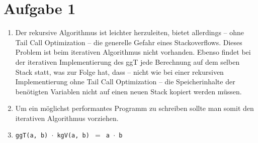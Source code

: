\section*{Aufgabe 1}
	\begin{enumerate}[nolistsep, label=\alph*)]
    	\item Der rekursive Algorithmus ist leichter herzuleiten, bietet allerdings -- ohne Tail Call Optimization -- die generelle Gefahr eines Stackoverflows. Dieses Problem ist beim iterativen Algorithmus nicht vorhanden. Ebenso findet bei der iterativen Implementierung des ggT jede Berechnung auf dem selben Stack statt, was zur Folge hat, dass -- nicht wie bei einer rekursiven Implementierung ohne Tail Call Optimization -- die Speicherinhalte der benötigten Variablen nicht auf einen neuen Stack kopiert werden müssen. 
        \item[] Um ein möglichst performantes Programm zu schreiben sollte man somit den iterativen Algorithmus vorziehen. 
        \item \texttt{ggT(a, b) $\cdot$ kgV(a, b) $=$ a $\cdot$ b}
    \end{enumerate}